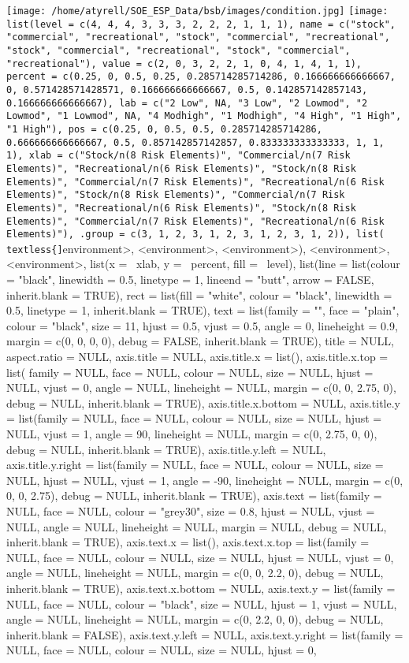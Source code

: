 \documentclass[
]{article}
\begin{document}
\texttt{[image: /home/atyrell/SOE\_ESP\_Data/bsb/images/condition.jpg]}
\texttt{[image: list(level = c(4, 4, 4, 3, 3, 3, 2, 2, 2, 1, 1, 1), name = c("stock", "commercial", "recreational", "stock", "commercial", "recreational", "stock", "commercial", "recreational", "stock", "commercial", "recreational"), value = c(2, 0, 3, 2, 2, 1, 0, 4, 1, 4, 1, 1), percent = c(0.25, 0, 0.5, 0.25, 0.285714285714286, 0.166666666666667, 0, 0.571428571428571, 0.166666666666667, 0.5, 0.142857142857143, 0.166666666666667), lab = c("2 Low", NA, "3 Low", "2 Lowmod", "2 Lowmod", "1 Lowmod", NA, "4 Modhigh", "1 Modhigh", "4 High", "1 High", "1 High"), pos = c(0.25, 0, 0.5, 0.5, 0.285714285714286, 0.666666666666667, 0.5, 0.857142857142857, 0.833333333333333, 1, 1, 1), xlab = c("Stock/n(8 Risk Elements)", "Commercial/n(7 Risk Elements)", "Recreational/n(6 Risk Elements)", "Stock/n(8 Risk Elements)", "Commercial/n(7 Risk Elements)", "Recreational/n(6 Risk Elements)", "Stock/n(8 Risk Elements)", "Commercial/n(7 Risk Elements)", "Recreational/n(6 Risk Elements)", "Stock/n(8 Risk Elements)", "Commercial/n(7 Risk Elements)", "Recreational/n(6 Risk Elements)"), .group = c(3, 1, 2, 3, 1, 2, 3, 1, 2, 3, 1, 2)), list(\\textless\{]}environment\textgreater{}, \textless{}environment\textgreater{}, \textless{}environment\textgreater{}), \textless{}environment\textgreater{}, \textless{}environment\textgreater{}, list(x = ~xlab, y = ~percent, fill = ~level), list(line = list(colour = "black", linewidth = 0.5, linetype = 1, lineend = "butt", arrow = FALSE, inherit.blank = TRUE), rect = list(fill = "white", colour = "black", linewidth = 0.5, linetype = 1, inherit.blank = TRUE), text = list(family = "", face = "plain", colour = "black", size = 11, hjust = 0.5, vjust = 0.5, angle = 0, lineheight = 0.9, margin = c(0, 0, 0, 0), debug = FALSE, inherit.blank = TRUE), title = NULL, aspect.ratio = NULL, axis.title = NULL, axis.title.x = list(), axis.title.x.top = list( family = NULL, face = NULL, colour = NULL, size = NULL, hjust = NULL, vjust = 0, angle = NULL, lineheight = NULL, margin = c(0, 0, 2.75, 0), debug = NULL, inherit.blank = TRUE), axis.title.x.bottom = NULL, axis.title.y = list(family = NULL, face = NULL, colour = NULL, size = NULL, hjust = NULL, vjust = 1, angle = 90, lineheight = NULL, margin = c(0, 2.75, 0, 0), debug = NULL, inherit.blank = TRUE), axis.title.y.left = NULL, axis.title.y.right = list(family = NULL, face = NULL, colour = NULL, size = NULL, hjust = NULL, vjust = 1, angle = -90, lineheight = NULL, margin = c(0, 0, 0, 2.75), debug = NULL, inherit.blank = TRUE), axis.text = list(family = NULL, face = NULL, colour = "grey30", size = 0.8, hjust = NULL, vjust = NULL, angle = NULL, lineheight = NULL, margin = NULL, debug = NULL, inherit.blank = TRUE), axis.text.x = list(), axis.text.x.top = list(family = NULL, face = NULL, colour = NULL, size = NULL, hjust = NULL, vjust = 0, angle = NULL, lineheight = NULL, margin = c(0, 0, 2.2, 0), debug = NULL, inherit.blank = TRUE), axis.text.x.bottom = NULL, axis.text.y = list(family = NULL, face = NULL, colour = "black", size = NULL, hjust = 1, vjust = NULL, angle = NULL, lineheight = NULL, margin = c(0, 2.2, 0, 0), debug = NULL, inherit.blank = FALSE), axis.text.y.left = NULL, axis.text.y.right = list(family = NULL, face = NULL, colour = NULL, size = NULL, hjust = 0, 
\end{document}
